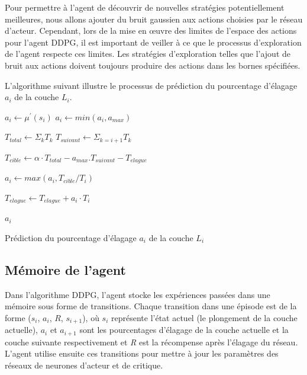 Pour permettre à l’agent de découvrir de nouvelles stratégies potentiellement meilleures, nous allons ajouter du bruit gaussien aux actions choisies par le réseau d’acteur. Cependant, lors de la mise en œuvre des limites de l'espace des actions pour l'agent DDPG, il est important de veiller à ce que le processus d'exploration de l'agent respecte ces limites. Les stratégies d'exploration telles que l'ajout de bruit aux actions doivent toujours produire des actions dans les bornes spécifiées.

L'algorithme suivant illustre le processus de prédiction du pourcentage d'élagage $a_i$ de la couche $L_i$.



\begin{algorithm}[H]

    $a_i \gets \mu^{'}(s_i)$ \;
    $a_i \gets min(a_i, a_{max})$ \;

    $T_{total} \gets \Sigma_k T_k$ \;
    $T_{suivant} \gets \Sigma_{k=i+1} T_k$ \;

    $T_{cible} \gets \alpha \cdot T_{total} - a_{max}.T_{suivant} - T_{elague}$ \;

    $a_i \gets max(a_i, T_{cible} / T_i)$ \;

    $T_{elague} \gets T_{elague} + a_i \cdot T_i$ \;

  \Return $a_i$ \;
  \caption{Prédiction du pourcentage d'élagage $a_i$ de la couche $L_i$}
  \label{alg:pruning-ratios}
\end{algorithm}
\FloatBarrier


\subsection{Mémoire de l'agent}
Dans l'algorithme DDPG, l'agent stocke les expériences passées dans une mémoire sous forme de transitions. Chaque transition dans une épisode est de la forme ($s_i$, $a_i$, $R$, $s_{i+1}$), où $s_i$ représente l'état actuel (le plongement de la couche actuelle), $a_i$ et $a_{i+1}$ sont les pourcentages d'élagage de la couche actuelle et la couche suivante respectivement et \textit{R} est la récompense après l'élagage du réseau. L'agent utilise ensuite ces transitions pour mettre à jour les paramètres des réseaux de neurones d'acteur et de critique.

